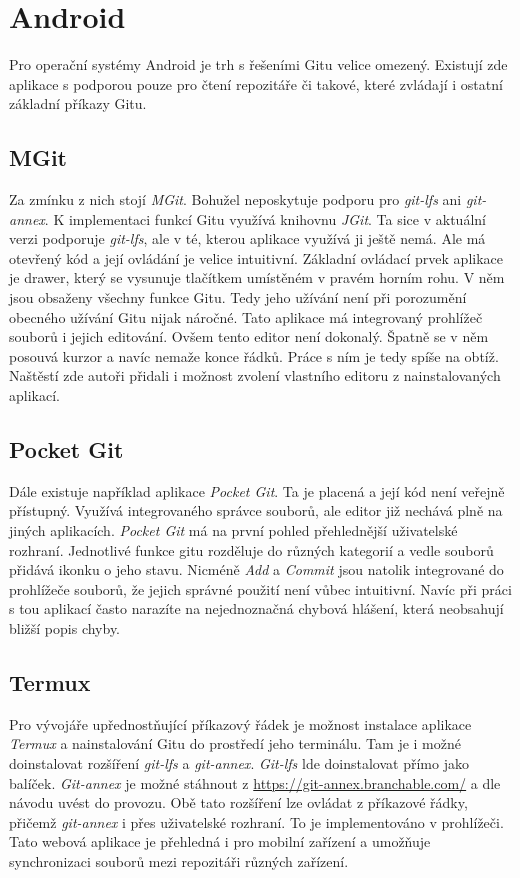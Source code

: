     \section {Android}
    Pro operační systémy Android je trh s řešeními Gitu velice omezený. Existují zde aplikace s podporou pouze pro čtení repozitáře či takové, které zvládají i ostatní základní příkazy Gitu.
    \subsection{MGit}
    Za zmínku z nich stojí \emph{MGit}. Bohužel neposkytuje podporu pro \emph{git-lfs} ani \emph{git-annex}. K implementaci funkcí Gitu využívá knihovnu \emph{JGit}. Ta sice v aktuální verzi podporuje \emph{git-lfs}, ale v té, kterou aplikace využívá ji ještě nemá. Ale 
    má otevřený kód a její ovládání je velice intuitivní.
    Základní ovládací prvek aplikace je drawer, který se vysunuje tlačítkem umístěném v pravém horním rohu. V něm jsou obsaženy všechny funkce Gitu. Tedy jeho užívání není při porozumění obecného užívání Gitu nijak náročné. Tato aplikace má integrovaný prohlížeč souborů i jejich editování. Ovšem tento editor není dokonalý. Špatně se v něm posouvá kurzor a navíc nemaže konce řádků. Práce s ním je tedy spíše na obtíž. Naštěstí zde autoři přidali i možnost zvolení vlastního editoru z nainstalovaných aplikací.

    \subsection{Pocket Git}
    Dále existuje například aplikace \emph{Pocket Git}. Ta je placená a její kód není veřejně přístupný. Využívá integrovaného správce souborů, ale editor již nechává plně na jiných aplikacích. \emph{Pocket Git} má na první pohled přehlednější uživatelské rozhraní. Jednotlivé funkce gitu rozděluje do různých kategorií a vedle souborů přidává ikonku o jeho stavu. Nicméně \emph{Add} a \emph{Commit} jsou natolik integrované do prohlížeče souborů, že jejich správné použití není vůbec intuitivní. Navíc při práci s tou aplikací často narazíte na nejednoznačná chybová hlášení, která neobsahují bližší popis chyby.

    \subsection{Termux}
    Pro vývojáře upřednostňující příkazový řádek je možnost instalace aplikace \emph{Termux} a nainstalování Gitu do prostředí jeho terminálu. Tam je i možné doinstalovat rozšíření \emph{git-lfs} a \emph{git-annex}. \emph{Git-lfs} lde doinstalovat přímo jako balíček. \emph{Git-annex} je možné stáhnout z \url{https://git-annex.branchable.com/} a dle návodu uvést do provozu. Obě tato rozšíření lze ovládat z příkazové řádky, přičemž \emph{git-annex} i přes uživatelské rozhraní. To je implementováno v prohlížeči. Tato webová aplikace je přehledná i pro mobilní zařízení a umožňuje synchronizaci souborů mezi repozitáři různých zařízení.


